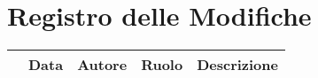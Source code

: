 \thispagestyle{empty}
\section*{Registro delle Modifiche}

\begin{center}
	\renewcommand{\arraystretch}{1.8}
	\begin{longtable}[c]{c | c | c | c | l}
		\rowcolor[HTML]{125E28}
		\multicolumn{1}{c}{\color[HTML]{FFFFFF} \textbf{Versione}} & 
		\multicolumn{1}{c}{\color[HTML]{FFFFFF} \textbf{Data}} & 
		\multicolumn{1}{c}{\color[HTML]{FFFFFF} \textbf{Autore}} & 
		\multicolumn{1}{c}{\color[HTML]{FFFFFF} \textbf{Ruolo}} & 
		\multicolumn{1}{c}{\color[HTML]{FFFFFF} \textbf{Descrizione}} \\
		\endhead
		

\end{longtable}
\end{center}
